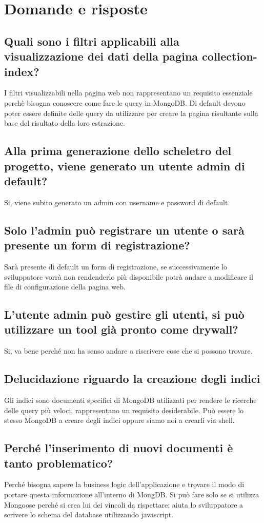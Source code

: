 \newpage
\section{Domande e risposte}
\label{2}

\subsection{Quali sono i filtri applicabili alla visualizzazione dei dati della pagina collection-index?} 
I filtri visualizzabili nella pagina web non rappresentano un requisito essenziale perchè bisogna conoscere come fare le query in MongoDB. Di default devono poter essere definite delle query da utilizzare per creare la pagina risultante sulla base del risultato della loro estrazione. 

\subsection{Alla prima generazione dello scheletro del progetto, viene generato un utente admin di default?}
Si, viene subito generato un admin con username e password di default.

\subsection{Solo l'admin può registrare un utente o sarà presente un form di registrazione?}
Sarà presente di default un form di registrazione, se successivamente lo sviluppatore vorrà non rendenderlo più disponibile potrà andare a modificare il file di configurazione della pagina web.

\subsection{L'utente admin può gestire gli utenti, si può utilizzare un tool già pronto come drywall?}
Si, va bene perché non ha senso andare a riscrivere cose che si possono trovare.

\subsection{Delucidazione riguardo la creazione degli indici}
Gli indici sono documenti specifici di MongoDB utilizzati per rendere le ricerche delle query più veloci, rappresentano un requisito desiderabile. Può essere lo stesso MongoDB a creare degli indici oppure siamo noi a crearli via shell.

\subsection{Perché l'inserimento di nuovi documenti è tanto problematico?}
Perché bisogna sapere la business logic dell'applicazione e trovare il modo di portare questa informazione all'interno di MongDB. Si può fare solo se si utilizza Mongoose perché si crea lui dei vincoli da rispettare; aiuta lo sviluppatore a scrivere lo schema del database utilizzando javascript.

